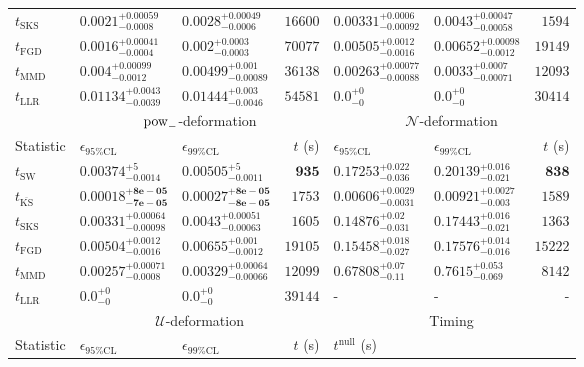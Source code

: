 \begin{tabular}{l|llr|llr}
	$t_{\mathrm{SKS}}$ & $0.0021_{-0.0008}^{+0.00059}$ & $0.0028_{-0.0006}^{+0.00049}$ & $16600$ & $0.00331_{-0.00092}^{+0.0006}$ & $0.0043_{-0.00058}^{+0.00047}$ & $1594$ \\
	$t_{\mathrm{FGD}}$ & ${\mathbf{0.0016_{-0.0004}^{+0.00041}}}$ & ${\mathbf{0.002_{-0.0003}^{+0.0003}}}$ & $70077$ & $0.00505_{-0.0016}^{+0.0012}$ & $0.00652_{-0.0012}^{+0.00098}$ & $19149$ \\
	$t_{\mathrm{MMD}}$ & $0.004_{-0.0012}^{+0.00099}$ & $0.00499_{-0.00089}^{+0.001}$ & $36138$ & $0.00263_{-0.00088}^{+0.00077}$ & $0.0033_{-0.00071}^{+0.0007}$ & $12093$ \\
	$t_{\mathrm{LLR}}$ & $0.01134_{-0.0039}^{+0.0043}$ & $0.01444_{-0.0046}^{+0.003}$ & $54581$ & $0.0_{-0}^{+0}$ & $0.0_{-0}^{+0}$ & $30414$ \\
	\toprule
	\multicolumn{1}{c}{} & \multicolumn{3}{c}{$\rm{pow}_{-}$-deformation} & \multicolumn{3}{c}{$\mathcal{N}$-deformation} \\
	Statistic & $\epsilon_{95\%\mathrm{CL}}$ & $\epsilon_{99\%\mathrm{CL}}$ & $t$ (s) & $\epsilon_{95\%\mathrm{CL}}$ & $\epsilon_{99\%\mathrm{CL}}$ & $t$ (s) \\
	\midrule
	$t_{\mathrm{SW}}$ & $0.00374_{-0.0014}^{+5}$ & $0.00505_{-0.0011}^{+5}$ & ${\mathbf{935}}$ & $0.17253_{-0.036}^{+0.022}$ & $0.20139_{-0.021}^{+0.016}$ & ${\mathbf{838}}$ \\
	$t_{\overline{\mathrm{KS}}}$ & ${\mathbf{0.00018_{-7e-05}^{+8e-05}}}$ & ${\mathbf{0.00027_{-8e-05}^{+8e-05}}}$ & $1753$ & ${\mathbf{0.00606_{-0.0031}^{+0.0029}}}$ & ${\mathbf{0.00921_{-0.003}^{+0.0027}}}$ & $1589$ \\
	$t_{\mathrm{SKS}}$ & $0.00331_{-0.00098}^{+0.00064}$ & $0.0043_{-0.00063}^{+0.00051}$ & $1605$ & $0.14876_{-0.031}^{+0.02}$ & $0.17443_{-0.021}^{+0.016}$ & $1363$ \\
	$t_{\mathrm{FGD}}$ & $0.00504_{-0.0016}^{+0.0012}$ & $0.00655_{-0.0012}^{+0.001}$ & $19105$ & $0.15458_{-0.027}^{+0.018}$ & $0.17576_{-0.016}^{+0.014}$ & $15222$ \\
	$t_{\mathrm{MMD}}$ & $0.00257_{-0.0008}^{+0.00071}$ & $0.00329_{-0.00066}^{+0.00064}$ & $12099$ & $0.67808_{-0.11}^{+0.07}$ & $0.7615_{-0.069}^{+0.053}$ & $8142$ \\
	$t_{\mathrm{LLR}}$ & $0.0_{-0}^{+0}$ & $0.0_{-0}^{+0}$ & $39144$ & - & - & - \\
	\toprule
	\multicolumn{1}{c}{} & \multicolumn{3}{c}{$\mathcal{U}$-deformation} & \multicolumn{3}{c}{Timing} \\
	Statistic & $\epsilon_{95\%\mathrm{CL}}$ & $\epsilon_{99\%\mathrm{CL}}$ & $t$ (s) & $t^{\mathrm{null}}$ (s) \\

\end{tabular}
